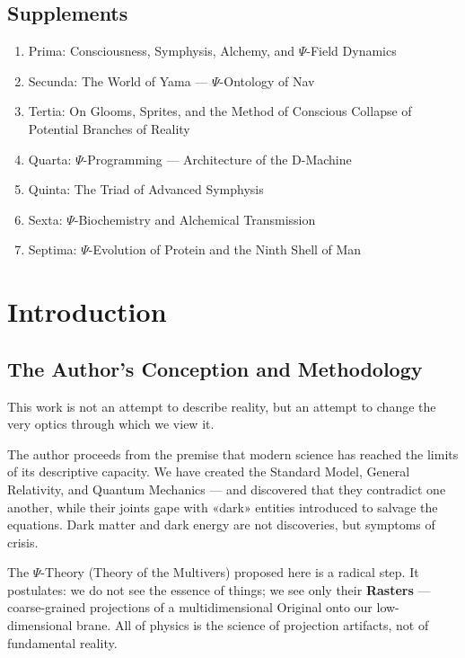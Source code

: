 \documentclass[a4paper,12pt]{article}
\begin{document}
	\subsection*{Supplements}
	\begin{enumerate}[label=S.\arabic*.]
		\item Prima: Consciousness, Symphysis, Alchemy, and $\Psi$-Field Dynamics
		\item Secunda: The World of Yama — $\Psi$-Ontology of Nav
		\item Tertia: On Glooms, Sprites, and the Method of Conscious Collapse of Potential Branches of Reality
		\item Quarta: $\Psi$-Programming — Architecture of the D-Machine
		\item Quinta: The Triad of Advanced Symphysis
		\item Sexta: $\Psi$-Biochemistry and Alchemical Transmission
		\item Septima: $\Psi$-Evolution of Protein and the Ninth Shell of Man
	\end{enumerate}
	
	\newpage
	
	\section*{Introduction}
	
	\subsection{The Author's Conception and Methodology}
	
	This work is not an attempt to describe reality, but an attempt to change the very optics through which we view it.
	
	The author proceeds from the premise that modern science has reached the limits of its descriptive capacity. We have created the Standard Model, General Relativity, and Quantum Mechanics — and discovered that they contradict one another, while their joints gape with «dark» entities introduced to salvage the equations. Dark matter and dark energy are not discoveries, but symptoms of crisis.
	
	The $\Psi$-Theory (Theory of the Multivers) proposed here is a radical step. It postulates: we do not see the essence of things; we see only their \textbf{Rasters} — coarse-grained projections of a multidimensional Original onto our low-dimensional brane. All of physics is the science of projection artifacts, not of fundamental reality.
	
\end{document}
